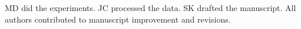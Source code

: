MD did the experiments. JC processed the data. SK drafted the
manuscript. All authors contributed to manuscript improvement and
revisions.
